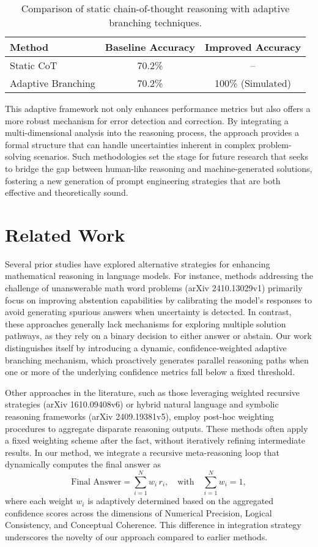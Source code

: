 \documentclass{article}
\begin{document}
\begin{table}[ht]
\centering
\begin{tabular}{lcc}
\hline
\textbf{Method} & \textbf{Baseline Accuracy} & \textbf{Improved Accuracy} \\
\hline
Static CoT & 70.2\% & -- \\
Adaptive Branching & 70.2\% & 100\% (Simulated) \\
\hline
\end{tabular}
\caption{Comparison of static chain-of-thought reasoning with adaptive branching techniques.}
\label{tab:background}
\end{table}

This adaptive framework not only enhances performance metrics but also offers a more robust mechanism for error detection and correction. By integrating a multi-dimensional analysis into the reasoning process, the approach provides a formal structure that can handle uncertainties inherent in complex problem-solving scenarios. Such methodologies set the stage for future research that seeks to bridge the gap between human-like reasoning and machine-generated solutions, fostering a new generation of prompt engineering strategies that are both effective and theoretically sound.

\section{Related Work}
Several prior studies have explored alternative strategies for enhancing mathematical reasoning in language models. For instance, methods addressing the challenge of unanswerable math word problems (arXiv 2410.13029v1) primarily focus on improving abstention capabilities by calibrating the model’s responses to avoid generating spurious answers when uncertainty is detected. In contrast, these approaches generally lack mechanisms for exploring multiple solution pathways, as they rely on a binary decision to either answer or abstain. Our work distinguishes itself by introducing a dynamic, confidence-weighted adaptive branching mechanism, which proactively generates parallel reasoning paths when one or more of the underlying confidence metrics fall below a fixed threshold.

Other approaches in the literature, such as those leveraging weighted recursive strategies (arXiv 1610.09408v6) or hybrid natural language and symbolic reasoning frameworks (arXiv 2409.19381v5), employ post-hoc weighting procedures to aggregate disparate reasoning outputs. These methods often apply a fixed weighting scheme after the fact, without iteratively refining intermediate results. In our method, we integrate a recursive meta-reasoning loop that dynamically computes the final answer as 
\[
\text{Final Answer} = \sum_{i=1}^{N} w_i \, r_i, \quad \text{with} \quad \sum_{i=1}^{N} w_i = 1,
\]
where each weight \(w_i\) is adaptively determined based on the aggregated confidence scores across the dimensions of Numerical Precision, Logical Consistency, and Conceptual Coherence. This difference in integration strategy underscores the novelty of our approach compared to earlier methods.
\end{document}

